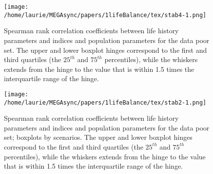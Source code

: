 \documentclass[12pt,doublespacing,a4paper]{ouparticle}
\begin{document}





\begin{figure}[htbp]
\centering
\texttt{[image: /home/laurie/MEGAsync/papers/1lifeBalance/tex/stab4-1.png]}
\caption{Spearman rank correlation coefficients between life history parameters and indices and population parameters for the data poor set. The upper and lower boxplot hinges correspond to the first and third quartiles (the $25^{th}$ and $75^{th}$ percentiles), while the whiskers extends from the hinge to the value that is within 1.5 times the interquartile range of the hinge.}
\label{fig:stab1}
\end{figure}

\begin{figure}[htbp]
\centering
\texttt{[image: /home/laurie/MEGAsync/papers/1lifeBalance/tex/stab2-1.png]}
\caption{Spearman rank correlation coefficients between life history parameters and indices and population parameters for the data poor set; boxplots by scenarios. The upper and lower boxplot hinges correspond to the first and third quartiles (the $25^{th}$ and $75^{th}$ percentiles), while the whiskers extends from the hinge to the value that is within 1.5 times the interquartile range of the hinge.}
\label{fig:stab2}
\end{figure}
\end{document}
